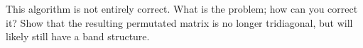   This algorithm is not entirely correct. What is the problem; how can
  you correct it? Show that the resulting permutated matrix is no
  longer tridiagonal, but will likely still have a band structure.

